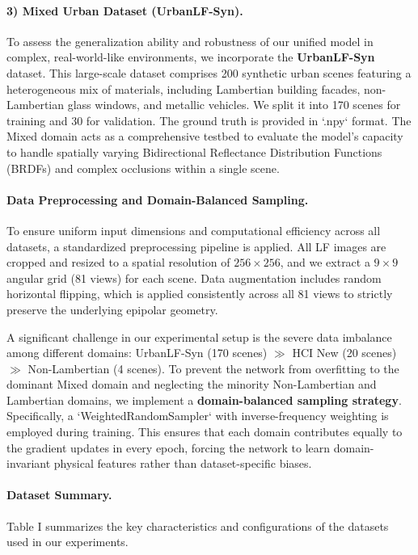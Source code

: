\paragraph{3) Mixed Urban Dataset (UrbanLF-Syn).}
To assess the generalization ability and robustness of our unified model in complex, real-world-like environments, we incorporate the \textbf{UrbanLF-Syn} dataset. This large-scale dataset comprises 200 synthetic urban scenes featuring a heterogeneous mix of materials, including Lambertian building facades, non-Lambertian glass windows, and metallic vehicles. We split it into 170 scenes for training and 30 for validation. The ground truth is provided in `.npy` format. The Mixed domain acts as a comprehensive testbed to evaluate the model's capacity to handle spatially varying Bidirectional Reflectance Distribution Functions (BRDFs) and complex occlusions within a single scene.

\paragraph{Data Preprocessing and Domain-Balanced Sampling.}
To ensure uniform input dimensions and computational efficiency across all datasets, a standardized preprocessing pipeline is applied. All LF images are cropped and resized to a spatial resolution of $256 \times 256$, and we extract a $9 \times 9$ angular grid (81 views) for each scene. Data augmentation includes random horizontal flipping, which is applied consistently across all 81 views to strictly preserve the underlying epipolar geometry.

A significant challenge in our experimental setup is the severe data imbalance among different domains: UrbanLF-Syn (170 scenes) $\gg$ HCI New (20 scenes) $\gg$ Non-Lambertian (4 scenes). To prevent the network from overfitting to the dominant Mixed domain and neglecting the minority Non-Lambertian and Lambertian domains, we implement a \textbf{domain-balanced sampling strategy}. Specifically, a `WeightedRandomSampler` with inverse-frequency weighting is employed during training. This ensures that each domain contributes equally to the gradient updates in every epoch, forcing the network to learn domain-invariant physical features rather than dataset-specific biases.

\paragraph{Dataset Summary.}
Table I summarizes the key characteristics and configurations of the datasets used in our experiments.

